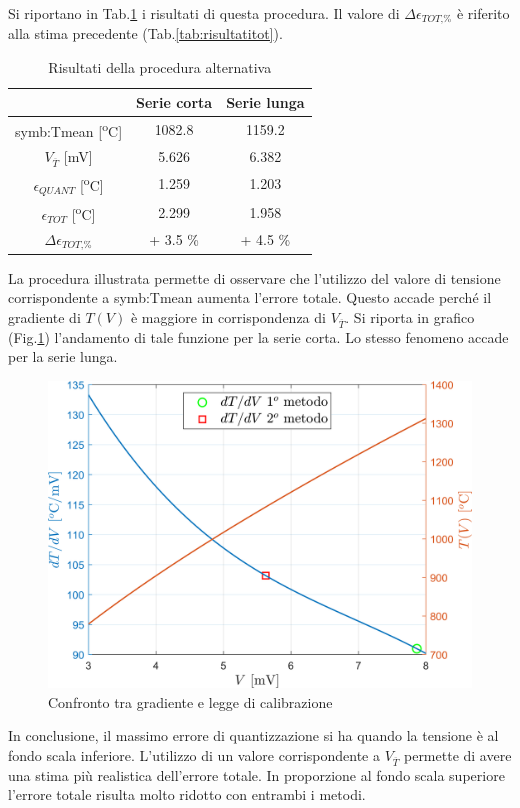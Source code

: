 Si riportano in Tab.\ref{tab:alternativa} i risultati di questa procedura. Il valore di $\Delta \epsilon_{\textit{TOT,\%}}$ è riferito alla stima precedente (Tab.\ref{tab:risultatitot}).

\begin{table}[H]
	\centering
	\begin{tabular}{c|c|c}
		\toprule
		\toprule
		& \textbf{Serie corta} & \textbf{Serie lunga}\\
		\midrule
		\gls{symb:Tmean} [\textsuperscript{o}C]& 1082.8 & 1159.2\\
		\midrule
		$V_{\overline{T}} $ [mV]& 5.626 & 6.382 \\
		\midrule
		$\epsilon_{\textit{QUANT}}$ [\textsuperscript{o}C]& 1.259 & 1.203 \\
		\midrule
		$\epsilon_{\textit{TOT}}$ [\textsuperscript{o}C]& 2.299 & 1.958\\
		\midrule
		$\Delta \epsilon_{\textit{TOT,\%}}$  & + 3.5 \% & + 4.5 \% \\
		\bottomrule
		\bottomrule
	\end{tabular}
	\caption{Risultati della procedura alternativa}
	\label{tab:alternativa}
\end{table}
La procedura illustrata permette di osservare che l'utilizzo del valore di tensione corrispondente a \gls{symb:Tmean} aumenta l'errore totale. Questo accade perché il gradiente di $T(V)$ è maggiore in corrispondenza di $V_{\overline{T}}$. Si riporta in grafico (Fig.\ref{fig:confronto}) l'andamento di tale funzione per la serie corta. Lo stesso fenomeno accade per la serie lunga. 
\begin{figure}
	\centering
	\includegraphics[width=0.6\linewidth]{"../sperimentazione nei propulsori/confronto"}
	\caption{Confronto tra gradiente e legge di calibrazione}
	\label{fig:confronto}
\end{figure}

In conclusione, il massimo errore di quantizzazione si ha quando la tensione è al fondo scala inferiore. L'utilizzo di un valore corrispondente a $V_{\overline{T}}$
permette di avere una stima più realistica dell'errore totale. In proporzione al fondo scala superiore l'errore totale risulta molto ridotto con entrambi i metodi. 